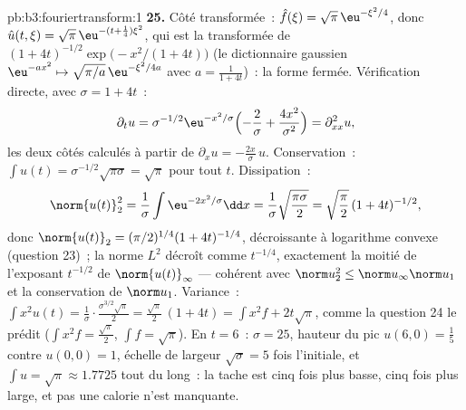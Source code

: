 \begin{solution}{pb:b3:fouriertransform:1}
\textbf{25.} Côté transformée~: $\hat f(\xi) =
\sqrt\pi\,\eu^{-\xi^2/4}$, donc $\hat u(t,\xi) =
\sqrt\pi\,\eu^{-(t + \frac14)\xi^2}$, qui est la transformée
de $(1 + 4t)^{-1/2}\exp\bigl(-x^2/(1+4t)\bigr)$ (le
dictionnaire gaussien $\eu^{-ax^2} \mapsto
\sqrt{\pi/a}\,\eu^{-\xi^2/4a}$ avec $a = \frac1{1+4t}$)~: la
forme fermée. Vérification directe, avec $\sigma = 1 + 4t$~:
\[
\partial_tu = \sigma^{-1/2}\eu^{-x^2/\sigma}
\Bigl(-\frac2\sigma + \frac{4x^2}{\sigma^2}\Bigr)
= \partial^2_{xx}u ,
\]
les deux côtés calculés à partir de $\partial_xu =
-\frac{2x}\sigma\,u$. Conservation~: $\int u(t) =
\sigma^{-1/2}\sqrt{\pi\sigma} = \sqrt\pi$ pour tout $t$.
Dissipation~:
\[
\norm{u(t)}_2^2 = \frac1\sigma\int\eu^{-2x^2/\sigma}\dd x
= \frac1\sigma\sqrt{\frac{\pi\sigma}2}
= \sqrt{\frac\pi2}\,(1+4t)^{-1/2},
\]
donc $\norm{u(t)}_2 = (\pi/2)^{1/4}(1+4t)^{-1/4}$,
décroissante à logarithme convexe (question 23)~; la norme
$L^2$ décroît comme $t^{-1/4}$, exactement la moitié de
l'exposant $t^{-1/2}$ de $\norm{u(t)}_\infty$ --- cohérent
avec $\norm u_2^2 \leq \norm u_\infty\norm u_1$ et la
conservation de $\norm u_1$. Variance~: $\int x^2u(t) =
\frac1\sigma\cdot\frac{\sigma^{3/2}\sqrt\pi}2 =
\frac{\sqrt\pi}2\,(1 + 4t) = \int x^2f + 2t\sqrt\pi$, comme
la question 24 le prédit ($\int x^2f = \frac{\sqrt\pi}2$,
$\int f = \sqrt\pi$). En $t = 6$~: $\sigma = 25$, hauteur du
pic $u(6, 0) = \frac15$ contre $u(0,0) = 1$, échelle de
largeur $\sqrt\sigma = 5$ fois l'initiale, et $\int u =
\sqrt\pi \approx 1.7725$ tout du long~: la tache est cinq
fois plus basse, cinq fois plus large, et pas une calorie
n'est manquante.
\end{solution}
